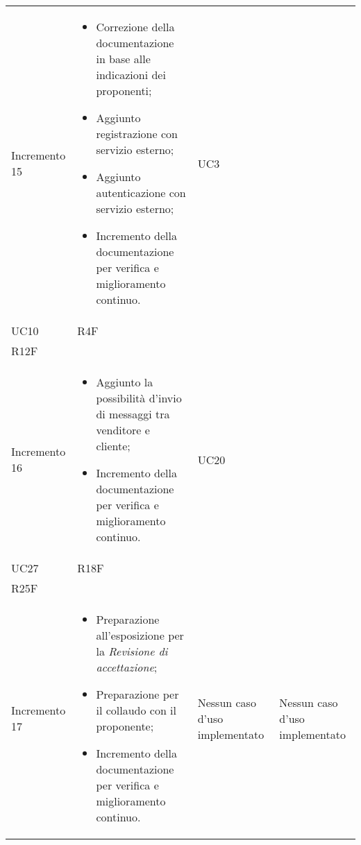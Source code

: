 \begin{longtable}{
    >{\centering}p{}
    >{\raggedright}p{}
    >{\centering}p{}
    >{\centering}p{}
    }
    \tabularnewline
    Incremento 15                 & \vspace{-15px}
    \begin{itemize}
        \renewcommand\labelitemi{-}
        \item Correzione della documentazione in base alle indicazioni dei proponenti;
        \item Aggiunto registrazione con servizio esterno;
        \item Aggiunto autenticazione con servizio esterno;
        \item Incremento della documentazione per verifica e miglioramento continuo.
    \end{itemize}    & UC3                                                                                            \\ UC10                                                                                                & R4F \\ R12F
    \tabularnewline
    Incremento 16                 & \vspace{-15px}
    \begin{itemize}
        \renewcommand\labelitemi{-}
        \item Aggiunto la possibilità d'invio di messaggi tra venditore e cliente;
        \item Incremento della documentazione per verifica e miglioramento continuo.
    \end{itemize}    & UC20                                                                                           \\ UC27  & R18F \\ R25F
    \tabularnewline

    Incremento 17                 & \vspace{-15px}
    \begin{itemize}
        \renewcommand\labelitemi{-}
        \item Preparazione all'esposizione per la \textit{Revisione di accettazione};
        \item Preparazione per il collaudo con il proponente;
        \item Incremento della documentazione per verifica e miglioramento continuo.
    \end{itemize}    & Nessun caso d'uso implementato & Nessun caso d'uso implementato
    \tabularnewline
\end{longtable}
\renewcommand{\arraystretch}{1}